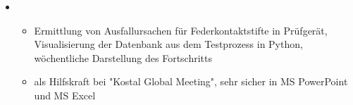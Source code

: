   \begin{itemize}[leftmargin=*]
    \item{
      {\small
      \begin{itemize}
        \item{Ermittlung von Ausfallursachen für Federkontaktstifte in Prüfgerät, Visualisierung der Datenbank aus dem Testprozess in Python, wöchentliche Darstellung des Fortschritts}
        \item{als Hilfskraft bei "Kostal Global Meeting", sehr sicher in MS PowerPoint und MS Excel}
      \end{itemize}
      }
    }
    
  \end{itemize}